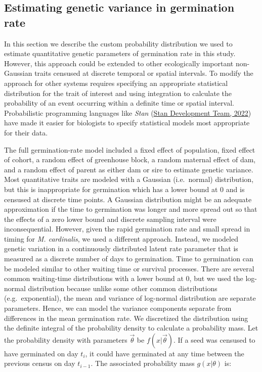 \documentclass[
  12pt,
]{article}
\begin{document}
\hypertarget{estimating-genetic-variance-in-germination-rate}{%
\subsection{Estimating genetic variance in germination rate}\label{estimating-genetic-variance-in-germination-rate}}

In this section we describe the custom probability distribution we used to estimate quantitative genetic parameters of germination rate in this study. However, this approach could be extended to other ecologically important non-Gaussian traits censused at discrete temporal or spatial intervals. To modify the approach for other systems requires specifying an appropriate statistical distribution for the trait of interest and using integration to calculate the probability of an event occurring within a definite time or spatial interval. Probabilistic programming languages like \emph{Stan} (\protect\hyperlink{ref-stan_development_team_stan_2022}{Stan Development Team, 2022}) have made it easier for biologists to specify statistical models most appropriate for their data.

The full germination-rate model included a fixed effect of population, fixed effect of cohort, a random effect of greenhouse block, a random maternal effect of dam, and a random effect of parent as either dam or sire to estimate genetic variance. Most quantitative traits are modeled with a Gaussian (i.e.~normal) distribution, but this is inappropriate for germination which has a lower bound at \(0\) and is censused at discrete time points. A Gaussian distribution might be an adequate approximation if the time to germination was longer and more spread out so that the effects of a zero lower bound and discrete sampling interval were inconsequential. However, given the rapid germination rate and small spread in timing for \emph{M. cardinalis}, we used a different approach. Instead, we modeled genetic variation in a continuously distributed latent rate parameter that is measured as a discrete number of days to germination. Time to germination can be modeled similar to other waiting time or survival processes. There are several common waiting-time distributions with a lower bound at \(0\), but we used the log-normal distribution because unlike some other common distributions (e.g.~exponential), the mean and variance of log-normal distribution are separate parameters. Hence, we can model the variance components separate from differences in the mean germination rate. We discretized the distribution using the definite integral of the probability density to calculate a probability mass. Let the probability density with parameters \(\vec{\theta}\) be \(f(x|\vec{\theta})\). If a seed was censused to have germinated on day \(t_i\), it could have germinated at any time between the previous census on day \(t_{i-1}\). The associated probability mass \(g(x|\theta)\) is:
\end{document}
